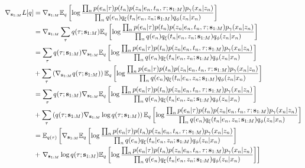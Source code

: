 \begin{equation}
    \begin{split}
    \nabla_{\inducingpoints}\L[q] &=
    \nabla_{\inducingpoints}\E_\q \left[\log \frac{\prod_\n \p(e_\n|\tree) \p(t_\n) \p(\z_\n | e_\n, t_\n, \tree; \inducingpoints)\p_\genparam(\x_\n | \z_\n)}{\prod_\n \q(e_\n)q_{\xi}(t_\n | e_\n, \z_\n; \inducingpoints)q_\recparam(\z_\n | \x_\n)}\right] \\
    &= \nabla_{\inducingpoints}\sum_{\tree} \q(\tree; \inducingpoints)\E_\q \left[\log \frac{\prod_\n \p(e_\n|\tree) \p(t_\n) \p(\z_\n | e_\n, t_\n, \tree; \inducingpoints)\p_\genparam(\x_\n | \z_\n)}{\prod_\n \q(e_\n)q_{\xi}(t_\n | e_\n, \z_\n; \inducingpoints)q_\recparam(\z_\n | \x_\n)}\right]\\
    &= \sum_\tree \q(\tree; \inducingpoints)\nabla_{\inducingpoints}\E_\q\left[\log \frac{\prod_\n \p(e_\n|\tree) \p(t_\n) \p(\z_\n | e_\n, t_\n, \tree; \inducingpoints)\p_\genparam(\x_\n | \z_\n)}{\prod_\n \q(e_\n)q_{\xi}(t_\n | e_\n, \z_\n; \inducingpoints)q_\recparam(\z_\n | \x_\n)}\right]\\
    &+ \sum_\tree \left(\nabla_{\inducingpoints} \q(\tree; \inducingpoints)\right)\E_\q \left[\log \frac{\prod_\n \p(e_\n|\tree) \p(t_\n) \p(\z_\n | e_\n, t_\n, \tree; \inducingpoints)\p_\genparam(\x_\n | \z_\n)}{\prod_\n \q(e_\n)q_{\xi}(t_\n | e_\n, \z_\n; \inducingpoints)q_\recparam(\z_\n | \x_\n)}\right]\\
    &= \sum_\tree \q(\tree; \inducingpoints)\nabla_{\inducingpoints}\E_\q\left[\log \frac{\prod_\n \p(e_\n|\tree) \p(t_\n) \p(\z_\n | e_\n, t_\n, \tree; \inducingpoints)\p_\genparam(\x_\n | \z_\n)}{\prod_\n \q(e_\n)q_{\xi}(t_\n | e_\n, \z_\n; \inducingpoints)q_\recparam(\z_\n | \x_\n)}\right]\\
    &+ \sum_\tree \left(\q(\tree;\inducingpoints)\nabla_{\inducingpoints} \log \q(\tree; \inducingpoints)\right)\E_\q \left[\log \frac{\prod_\n \p(e_\n|\tree) \p(t_\n) \p(\z_\n | e_\n, t_\n, \tree; \inducingpoints)\p_\genparam(\x_\n | \z_\n)}{\prod_\n \q(e_\n)q_{\xi}(t_\n | e_\n, \z_\n; \inducingpoints)q_\recparam(\z_\n | \x_\n)}\right]\\
    &= \E_{\q(\tree)}\left[\nabla_{\inducingpoints}\E_\q\left[\log \frac{\prod_\n \p(e_\n|\tree) \p(t_\n) \p(\z_\n | e_\n, t_\n, \tree; \inducingpoints)\p_\genparam(\x_\n | \z_\n)}{\prod_\n \q(e_\n)q_{\xi}(t_\n | e_\n, \z_\n; \inducingpoints)q_\recparam(\z_\n | \x_\n)}\right]\right.\\
    &+ \left.\nabla_{\inducingpoints} \log \q(\tree; \inducingpoints)\E_\q \left[\log \frac{\prod_\n \p(e_\n|\tree) \p(t_\n) \p(\z_\n | e_\n, t_\n, \tree; \inducingpoints)\p_\genparam(\x_\n | \z_\n)}{\prod_\n \q(e_\n)q_{\xi}(t_\n | e_\n, \z_\n; \inducingpoints)q_\recparam(\z_\n | \x_\n)}\right]\right]\\

\end{split}
\end{equation}
